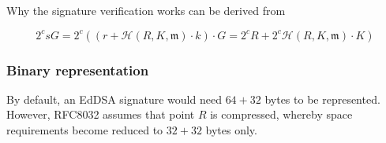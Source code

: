 Why the signature verification works can be derived from

\[ 2^c s G = 2^c ( (r + \mathcal{H}(R, K,  \mathfrak{m}) \cdot k) \cdot G = 2^c R + 2^c \mathcal{H}(R, K,  \mathfrak{m}) \cdot K )\]



\subsubsection{Binary representation}

By default, an EdDSA signature would need \(64 + 32 \) bytes to be represented.
However, RFC8032 assumes that point \(R\) is compressed, whereby space requirements become reduced to \(32 + 32\) bytes only.

